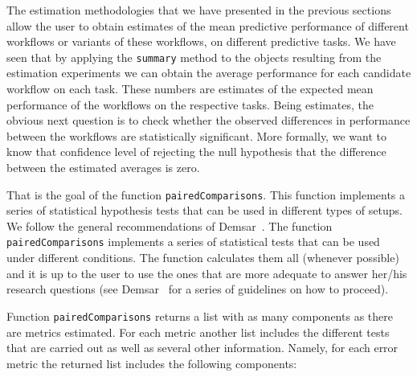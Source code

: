 \documentclass[10pt,a4paper]{article}\usepackage[]{graphicx}\usepackage[]{color}
\begin{document}
The estimation methodologies that we have presented in the previous
sections allow the user to obtain estimates of the mean predictive
performance of different workflows or variants of these workflows, on
different predictive tasks. We have seen that by applying the
\texttt{summary} method to the objects resulting from the estimation experiments
we can obtain the average performance for each candidate workflow on
each task. These numbers are estimates of the expected mean
performance of the workflows on the respective tasks. Being estimates,
the obvious next question is to check whether the observed differences
in performance between the workflows are statistically
significant. More formally, we want to know that confidence level of rejecting the null hypothesis that the difference between the estimated averages is zero.

That is the goal of the function
\texttt{pairedComparisons}. This function implements a series of statistical hypothesis tests that can be used in different types of setups. We follow the general recommendations of Demsar~\cite{Dem06}. The function \texttt{pairedComparisons} implements a series of statistical tests that can be used under different conditions. The function calculates them all (whenever possible) and it is up to the user to use the ones that are more adequate to answer her/his research questions (see Demsar~\cite{Dem06} for a series of guidelines on how to proceed).

Function \texttt{pairedComparisons} returns a list with as many components as there are metrics estimated. For each metric another list includes the different tests that are carried out as well as several other information. Namely, for each error metric the returned list includes the following components:
\end{document}
